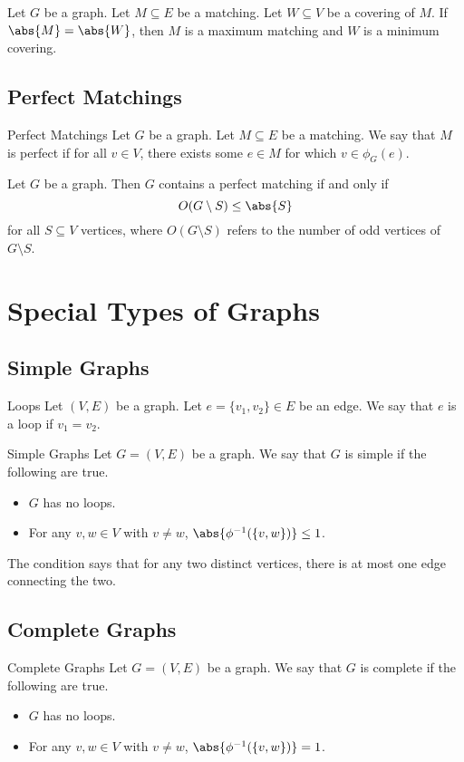 \documentclass[a4paper]{article}
\begin{document}
\begin{lmm}{}{} Let $G$ be a graph. Let $M\subseteq E$ be a matching. Let $W\subseteq V$ be a covering of $M$. If $\abs{M}=\abs{W}$, then $M$ is a maximum matching and $W$ is a minimum covering. 
\end{lmm}

\subsection{Perfect Matchings}
\begin{defn}{Perfect Matchings}{} Let $G$ be a graph. Let $M\subseteq E$ be a matching. We say that $M$ is perfect if for all $v\in V$, there exists some $e\in M$ for which $v\in\phi_G(e)$. 
\end{defn}

\begin{prp}{}{} Let $G$ be a graph. Then $G$ contains a perfect matching if and only if $$O(G\setminus S)\leq\abs{S}$$ for all $S\subseteq V$ vertices, where $O(G\setminus S)$ refers to the number of odd vertices of $G\setminus S$. 
\end{prp}

\pagebreak
\section{Special Types of Graphs}
\subsection{Simple Graphs}
\begin{defn}{Loops}{} Let $(V,E)$ be a graph. Let $e=\{v_1,v_2\}\in E$ be an edge. We say that $e$ is a loop if $v_1=v_2$. 
\end{defn}

\begin{defn}{Simple Graphs}{} Let $G=(V,E)$ be a graph. We say that $G$ is simple if the following are true. 
\begin{itemize}
\item $G$ has no loops. 
\item For any $v,w\in V$ with $v\neq w$, $\abs{\phi^{-1}(\{v,w\})}\leq 1$. 
\end{itemize}
\end{defn}

The condition says that for any two distinct vertices, there is at most one edge connecting the two. 

\subsection{Complete Graphs}
\begin{defn}{Complete Graphs}{} Let $G=(V,E)$ be a graph. We say that $G$ is complete if the following are true. 
\begin{itemize}
\item $G$ has no loops. 
\item For any $v,w\in V$ with $v\neq w$, $\abs{\phi^{-1}(\{v,w\})}=1$. 
\end{itemize}
\end{defn}
\end{document}
